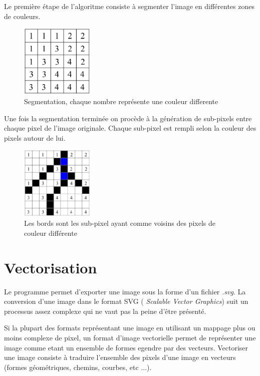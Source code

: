 \documentclass[twoside,openright,a4paper,11pt,french]{article}
\begin{document}
Le première étape de l'algoritme consiste à segmenter l'image en
différentes zones de couleurs.

\begin{figure}[h]
\centering
\includegraphics[width=3.5cm]{./pics/cluster-edges1.eps}
\caption{Segmentation, chaque nombre représente une couleur differente}
\label{fig:routcidr}
\end{figure}

Une fois la segmentation terminée on procède à la génération de
sub-pixels entre chaque pixel de l'image originale. Chaque sub-pixel
est rempli selon la couleur des pixels autour de lui.

\begin{figure}[h]
\centering
\includegraphics[width=3.5cm]{./pics/cluster-edges2.eps}
\caption{Les bords sont les sub-pixel ayant comme voisins des pixels de
couleur différente}
\label{fig:routcidr}
\end{figure}

\newpage

\section{Vectorisation} 
Le programme permet d'exporter une image sous la forme d'un fichier
{\it .svg}. La conversion d'une image dans le format SVG ({\it
Scalable Vector Graphics}) suit un processus assez complexe qui ne vaut
pas la peine d'être présenté.

Si la plupart des formats représentant une image en utilisant un 
mappage plus ou moins complexe de pixel, un format d'image vectorielle
permet de représenter une image comme etant un ensemble de formes
egendre par des vecteurs. Vectoriser une image consiste à traduire
l'ensemble des pixels d'une image en vecteurs (formes géométriques,
chemins, courbes, etc ...).
\end{document}
